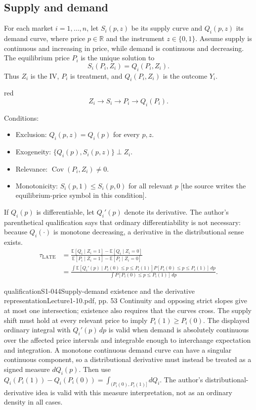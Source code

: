 \subsection{Supply and demand}
For each market $i=1,\ldots,n$, let $S_i(p,z)$ be its supply curve and $Q_i(p,z)$ its demand curve, where price $p\in\mathbb R$ and the instrument $z\in\{0,1\}$. Assume supply is continuous and increasing in price, while demand is continuous and decreasing. The equilibrium price $P_i$ is the unique solution to
\[
 S_i(P_i,Z_i)=Q_i(P_i,Z_i).
\]
Thus $Z_i$ is the IV, $P_i$ is treatment, and $Q_i(P_i,Z_i)$ is the outcome $Y_i$. \begin{inkblock}{red}\[ Z_i\longrightarrow S_i\longrightarrow P_i\longrightarrow Q_i(P_i). \]\end{inkblock}

Conditions:
\begin{itemize}
 \item Exclusion: $Q_i(p,z)=Q_i(p)$ for every $p,z$.
 \item Exogeneity: $\{Q_i(p),S_i(p,z)\}\perp Z_i$.
 \item Relevance: $\operatorname{Cov}(P_i,Z_i)\ne0$.
 \item Monotonicity: $S_i(p,1)\le S_i(p,0)$ for all relevant $p$ [the source writes the equilibrium-price symbol in this condition].
\end{itemize}
If $Q_i(p)$ is differentiable, let $Q_i'(p)$ denote its derivative. The author's parenthetical qualification says that ordinary differentiability is not necessary: because $Q_i(\cdot)$ is monotone decreasing, a derivative in the distributional sense exists.
\begin{align*}
 \tau_{\mathrm{LATE}}
 &=\frac{\mathbb E[Q_i\mid Z_i=1]-\mathbb E[Q_i\mid Z_i=0]}
 {\mathbb E[P_i\mid Z_i=1]-\mathbb E[P_i\mid Z_i=0]}\\
 &=\frac{\displaystyle\int
 \mathbb E[Q_i'(p)\mid P_i(0)\le p\le P_i(1)]
 P[P_i(0)\le p\le P_i(1)]\,dp}
 {\displaystyle\int P[P_i(0)\le p\le P_i(1)]\,dp}.
\end{align*}
\begin{reviewnote}{qualification}{S1-044}{Supply-demand existence and the derivative representation}{Lecture1-10.pdf, pp. 53}
Continuity and opposing strict slopes give at most one intersection; existence also requires that the curves cross. The supply shift must hold at every relevant price to imply $P_i(1)\ge P_i(0)$. The displayed ordinary integral with $Q_i'(p)\,dp$ is valid when demand is absolutely continuous over the affected price intervals and integrable enough to interchange expectation and integration. A monotone continuous demand curve can have a singular continuous component, so a distributional derivative must instead be treated as a signed measure $dQ_i(p)$. Then use $Q_i(P_i(1))-Q_i(P_i(0))=\int_{(P_i(0),P_i(1)]}dQ_i$. The author's distributional-derivative idea is valid with this measure interpretation, not as an ordinary density in all cases.
\end{reviewnote}


